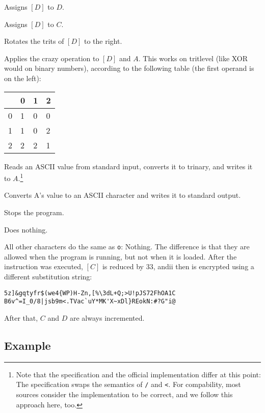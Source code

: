 \begin{description}[labelsep=1em]
    \item[\texttt{j}] Assigns $[D]$ to $D$.
    \item[\texttt{i}] Assigns $[D]$ to $C$.
    \item[\texttt{*}] Rotates the trits of $[D]$ to the right.
    \item[\texttt{p}] Applies the crazy operation to $[D]$ and $A$. This works on tritlevel (like XOR would on binary numbers), according to the following table (the first operand is on the left):

     \begin{tabular}{l|lll}
     & 0 & 1 & 2\\
     \hline
     0 & 1 & 0 & 0\\
     1 & 1 & 0 & 2\\
     2 & 2 & 2 & 1
     \end{tabular}

    \item[\texttt{/}] Reads an ASCII value from standard input, converts it to trinary, and writes it to $A$.\footnote{Note that the specification and the official implementation differ at this point: The specification swaps the semantics of \texttt{/} and \texttt{<}. For compability, most sources consider the implementation to be correct, and we follow this approach here, too.}
    \item[\texttt{<}] Converts A's value to an ASCII character and writes it to standard output.
    \item[\texttt{v}] Stops the program.
    \item[\texttt{o}] Does nothing.
\end{description}

All other characters do the same as \texttt{o}: Nothing. The difference is that they are allowed when the program is running, but not when it is loaded. After the instruction was executed, $[C]$ is reduced by 33, andii then is encrypted using a different substitution string:

\begin{lstlisting}[numbers=none,frame=none]
5z]&gqtyfr$(we4{WP)H-Zn,[%\3dL+Q;>U!pJS72FhOA1C
B6v^=I_0/8|jsb9m<.TVac`uY*MK'X~xDl}REokN:#?G"i@
\end{lstlisting}

After that, $C$ and $D$ are always incremented.

\subsection{Example}

